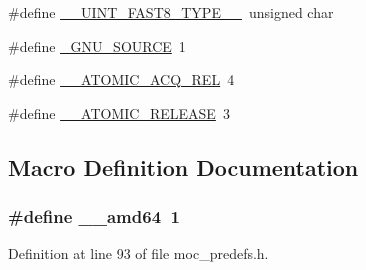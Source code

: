 \begin{DoxyCompactItemize}
\item 
\#define \hyperlink{build-analizer__host-_desktop___qt__5__9__0___g_c_c__64bit-_release_2moc__predefs_8h_a8cf0f2397b96d2a198ff932dbfa50344}{\+\_\+\+\_\+\+U\+I\+N\+T\+\_\+\+F\+A\+S\+T8\+\_\+\+T\+Y\+P\+E\+\_\+\+\_\+}~unsigned char
\item 
\#define \hyperlink{build-analizer__host-_desktop___qt__5__9__0___g_c_c__64bit-_release_2moc__predefs_8h_a369266c24eacffb87046522897a570d5}{\+\_\+\+G\+N\+U\+\_\+\+S\+O\+U\+R\+C\+E}~1
\item 
\#define \hyperlink{build-analizer__host-_desktop___qt__5__9__0___g_c_c__64bit-_release_2moc__predefs_8h_acdfdd67de0664b690c42bba327cf7da1}{\+\_\+\+\_\+\+A\+T\+O\+M\+I\+C\+\_\+\+A\+C\+Q\+\_\+\+R\+E\+L}~4
\item 
\#define \hyperlink{build-analizer__host-_desktop___qt__5__9__0___g_c_c__64bit-_release_2moc__predefs_8h_a5822cf04414d99e0ee81e8bbe182226b}{\+\_\+\+\_\+\+A\+T\+O\+M\+I\+C\+\_\+\+R\+E\+L\+E\+A\+S\+E}~3
\end{DoxyCompactItemize}


\subsection{Macro Definition Documentation}
\hypertarget{build-analizer__host-_desktop___qt__5__9__0___g_c_c__64bit-_release_2moc__predefs_8h_ac78e83c300ae463c501bbe70c5a2a8c7}{
\subsubsection[{\+\_\+\+\_\+amd64}]{\setlength{\rightskip}{0pt plus 5cm}\#define \+\_\+\+\_\+amd64~1}}\label{build-analizer__host-_desktop___qt__5__9__0___g_c_c__64bit-_release_2moc__predefs_8h_ac78e83c300ae463c501bbe70c5a2a8c7}


Definition at line 93 of file moc\+\_\+predefs.\+h.

